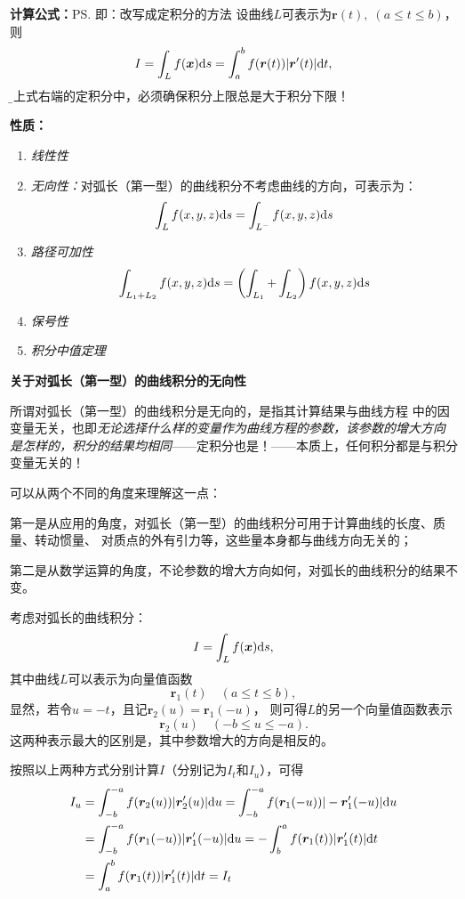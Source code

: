 
{\bf 计算公式：}\ps{即：改写成定积分的方法}
设曲线$L$可表示为$\bm{r}(t),\;(a\leq t\leq b)$，则
$$I=\displaystyle\int_Lf(\bm{x})\mathrm{d} s=\displaystyle\int_a^bf(\bm{r}(t))|\bm{r}'(t)|\mathrm{d} t,$$
{\b 在上式右端的定积分中，必须确保积分上限总是大于积分下限！}

{\bf 性质：}

\begin{enumerate}[(1)]
  \setlength{\itemindent}{1cm}
  \item {\it 线性性} 
  \item {\it 无向性：}对弧长（第一型）的曲线积分不考虑曲线的方向，可表示为：
  $$\displaystyle\int_Lf(x,y,z)\mathrm{d} s=\displaystyle\int_{L^-}f(x,y,z)\mathrm{d} s$$
  \item {\it 路径可加性}
  $$\displaystyle\int_{L_1+L_2}f(x,y,z)\mathrm{d} s=\left(\displaystyle\int_{L_1}+\displaystyle\int_{
  L_2}\right)f(x,y,z)\mathrm{d} s$$
  \item {\it 保号性}
  \item {\it 积分中值定理}
\end{enumerate}

\begin{shaded}

{\bf 关于对弧长（第一型）的曲线积分的无向性}

所谓对弧长（第一型）的曲线积分是无向的，是指其计算结果与曲线方程
中的因变量无关，也即{\it 无论选择什么样的变量作为曲线方程的参数，该参数的增大方向
是怎样的，积分的结果均相同}——{定积分也是！}——本质上，任何积分都是与积分变量无关的！

可以从两个不同的角度来理解这一点：

第一是从应用的角度，对弧长（第一型）的曲线积分可用于计算曲线的长度、质量、转动惯量、
对质点的外有引力等，这些量本身都与曲线方向无关的；

第二是从数学运算的角度，不论参数的增大方向如何，对弧长的曲线积分的结果不变。

考虑对弧长的曲线积分：
$$I=\displaystyle\int_Lf(\bm{x})\mathrm{d} s,$$
其中曲线$L$可以表示为向量值函数
$$\bm{r}_1(t)\quad(a\leq t\leq b),$$
显然，若令$u=-t$，且记$\bm{r}_2(u)=\bm{r}_1(-u)$，
则可得$L$的另一个向量值函数表示
$$\bm{r}_2(u)\quad(-b\leq u\leq -a).$$
这两种表示最大的区别是，其中参数增大的方向是相反的。

按照以上两种方式分别计算$I$（分别记为$I_t$和$I_u$），可得
\begin{align*}
	I_u&=\displaystyle\int_{-b}^{-a}f(\bm{r}_2(u))|\bm{r}'_2(u)|\mathrm{d} u
	=\displaystyle\int_{-b}^{-a}f(\bm{r}_1(-u))|-\bm{r}'_1(-u)|\mathrm{d} u\\
	&=\displaystyle\int_{-b}^{-a}f(\bm{r}_1(-u))|\bm{r}'_1(-u)|\mathrm{d} u
	=-\displaystyle\int_{b}^{a}f(\bm{r}_1(t))|\bm{r}'_1(t)|\mathrm{d} t\\
	&=\displaystyle\int_{a}^{b}f(\bm{r}_1(t))|\bm{r}'_1(t)|\mathrm{d} t=I_t
\end{align*}

\end{shaded}

